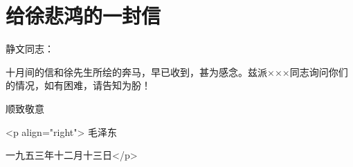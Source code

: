 \section[给徐悲鸿的一封信（一九五三年十二月十三日）]{给徐悲鸿的一封信}


静文同志：

十月间的信和徐先生所绘的奔马，早已收到，甚为感念。兹派×××同志询问你们的情况，如有困难，请告知为朌！


顺致敬意

<p align="right"> 毛泽东

一九五三年十二月十三日</p>


